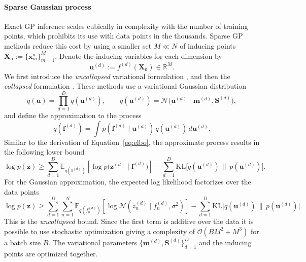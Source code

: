\paragraph{Sparse Gaussian process}

Exact GP inference scales cubically in complexity with the number of training points, which prohibits its use with data points in the thousands. Sparse GP methods reduce this cost by using a smaller set $M\ll N$ of inducing points  $\mathbf{X}_{\mathrm u}:=\{\boldsymbol{x}^{\mathrm u}_m\}_{m=1}^M$.
Denote the inducing variables for each dimension by
\begin{equation*}
    \mathbf{u}^{(d)} := f^{(d)}(\mathbf{X}_{\mathrm u}) \in \mathbb{R}^M.
\end{equation*}
We first introduce the \emph{uncollapsed} variational formulation \citep{Hensman2013}, and then the \emph{collapsed} formulation \citep{titsias2009variational}. 
These methods use a variational Gaussian distribution 
\begin{equation*}
    q(\mathbf u)=\prod_{d=1}^D q(\mathbf u^{(d)}),
\qquad
q(\mathbf u^{(d)})=\mathcal N\!\bigl(\mathbf u^{(d)} \mid \mathbf m^{(d)}, \mathbf S^{(d)}\bigr),
\end{equation*}
and define the approximation to the process
\begin{equation*}
    q(\mathbf f^{(d)}) = \int p(\mathbf f^{(d)} \mid \mathbf u^{(d)})\,q(\mathbf u^{(d)})\,d\mathbf u^{(d)}.
\end{equation*}
Similar to the derivation of Equation~\ref{eq:elbo}, the approximate process results in the following lower bound 
\begin{equation}
\log p(\boldsymbol{z})
\geq
\sum_{d=1}^D \mathbb E_{q(\mathbf f^{(d)})}\!\left[\log p\bigl(\boldsymbol{z}^{(d)}\mid \mathbf f^{(d)}\bigr)\right]
-\sum_{d=1}^D \mathrm{KL}\bigl[q(\mathbf u^{(d)})\,\|\,p(\mathbf u^{(d)})\bigr].
\label{eq:lower_bound_uncollapsed}
\end{equation}
For the Gaussian approximation, the expected log likelihood factorizes over the data points
\begin{equation*}
 \log p(\boldsymbol z) \geq\sum_{d=1}^D \sum_{n=1}^N \mathbb{E}_{q(f^{(d)}_n)}\!\left[ \log 
 \mathcal{N}(z^{(d)}_n\mid f^{(d)}_n, \sigma^2)\right]
-\sum_{d=1}^D \mathrm{KL}\bigl[q(\mathbf u^{(d)})\,\|\,p(\mathbf u^{(d)})\bigr].   
\end{equation*}
This is the \emph{uncollapsed} bound. Since the first term is additive over the data it is possible to use stochastic optimization giving a complexity of $\mathcal{O}(BM^2 + M^3)$ for a batch size $B$. The variational parameters $\{\mathbf m^{(d)},\mathbf S^{(d)}\}_{d=1}^D$ and the inducing points are optimized together.

